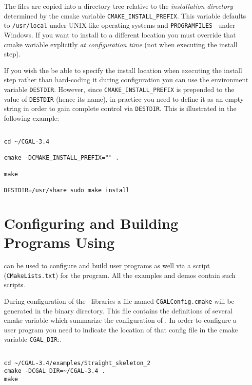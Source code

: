 The files are copied into a directory tree relative to the {\em installation directory} determined by the 
cmake variable \texttt{CMAKE\_INSTALL\_PREFIX}. This variable defaults to {\tt /usr/local} under UNIX-like operating systems
and {\tt PROGRAMFILES } under Windows. If you want to install to a different location you must override that cmake
variable explicitly {\em at configuration time} (not when executing the install step).

If you wish the be able to specify the install location when executing the install step rather than hard-coding it during
configuration you can use the environment variable \texttt{DESTDIR}. However, since \texttt{CMAKE\_INSTALL\_PREFIX} is prepended
to the value of \texttt{DESTDIR} (hence its name), in practice you need to define it as an empty string in order to gain complete
control via \texttt{DESTDIR}.
This is illustrated in the following example:

{\ccTexHtml{\scriptsize}{}
\begin{verbatim}

cd ~/CGAL-3.4

cmake -DCMAKE_INSTALL_PREFIX="" . 

make

DESTDIR=/usr/share sudo make install

\end{verbatim}
}



\section{Configuring and Building Programs Using \cgal}

\cmake can be used to configure and build user programs as well via a \cmake script ({\tt CMakeLists.txt}) for the program.
All the examples and demos contain such \cmake scripts.

During configuration of the \cgal\ libraries a file named {\tt CGALConfig.cmake} will be generated in the binary directory. This file contains
the definitions of several cmake variable which summarize the configuration of \cgal. In order to configure a user program you need to indicate
the location of that config file in the cmake variable \texttt{CGAL\_DIR}:.

{\ccTexHtml{\scriptsize}{}
\begin{verbatim}

cd ~/CGAL-3.4/examples/Straight_skeleton_2
cmake -DCGAL_DIR=~/CGAL-3.4 .
make

\end{verbatim}
}

